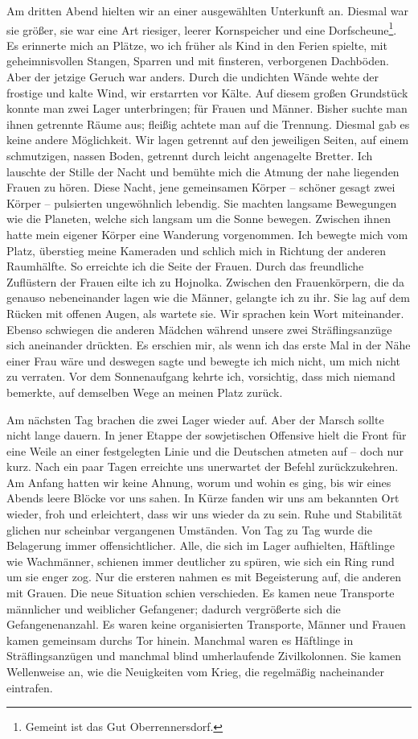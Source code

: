 \documentclass[a4paper,12pt,ngerman,
]{nisebook}
\begin{document}
Am dritten Abend hielten wir an einer ausgewählten Unterkunft an. Diesmal war sie größer, sie war eine Art riesiger, leerer Kornspeicher und eine Dorfscheune\footnote{Gemeint ist das Gut Oberrennersdorf.}. Es erinnerte mich an Plätze, wo ich früher als Kind in den Ferien spielte, mit geheimnisvollen Stangen, Sparren und mit finsteren, verborgenen Dachböden. Aber der jetzige Geruch war anders. Durch die undichten Wände wehte der frostige und kalte Wind, wir erstarrten vor Kälte. Auf diesem großen Grundstück konnte man zwei Lager unterbringen; für Frauen und Männer. Bisher suchte man ihnen getrennte Räume aus; fleißig achtete man auf die Trennung. Diesmal gab es keine andere Möglichkeit. Wir lagen getrennt auf den jeweiligen Seiten, auf einem schmutzigen, nassen Boden, getrennt durch leicht angenagelte Bretter. Ich lauschte der Stille der Nacht und bemühte mich die Atmung der nahe liegenden Frauen zu hören. Diese Nacht, jene gemeinsamen Körper -- schöner gesagt zwei Körper -- pulsierten ungewöhnlich lebendig. Sie machten langsame Bewegungen wie die Planeten, welche sich langsam um die Sonne bewegen. Zwischen ihnen hatte mein eigener Körper eine Wanderung vorgenommen. Ich bewegte mich vom Platz, überstieg meine Kameraden und schlich mich in Richtung der anderen Raumhälfte. So erreichte ich die Seite der Frauen. Durch das freundliche Zuflüstern der Frauen eilte ich zu Hojnolka. Zwischen den Frauenkörpern, die da genauso nebeneinander lagen wie die Männer, gelangte ich zu ihr. Sie lag auf dem Rücken mit offenen Augen, als wartete sie. Wir sprachen kein Wort miteinander. Ebenso schwiegen die anderen Mädchen während unsere zwei Sträflingsanzüge sich aneinander drückten. Es erschien mir, als wenn ich das erste Mal in der Nähe einer Frau wäre und deswegen sagte und bewegte ich mich nicht, um mich nicht zu verraten. Vor dem Sonnenaufgang kehrte ich, vorsichtig, dass mich niemand bemerkte, auf demselben Wege an meinen Platz zurück.

Am nächsten Tag brachen die zwei Lager wieder auf. Aber der Marsch sollte nicht lange dauern. In jener Etappe der sowjetischen Offensive hielt die Front für eine Weile an einer festgelegten Linie und die Deutschen atmeten auf -- doch nur kurz. Nach ein paar Tagen erreichte uns unerwartet der Befehl zurückzukehren. Am Anfang hatten wir keine Ahnung, worum und wohin es ging, bis wir eines Abends leere Blöcke vor uns sahen. In Kürze fanden wir uns am bekannten Ort wieder, froh und erleichtert, dass wir uns wieder da zu sein. Ruhe und Stabilität glichen nur scheinbar vergangenen Umständen. Von Tag zu Tag wurde die Belagerung immer offensichtlicher. Alle, die sich im Lager aufhielten, Häftlinge wie Wachmänner, schienen immer deutlicher zu spüren, wie sich ein Ring rund um sie enger zog. Nur die ersteren nahmen es mit Begeisterung auf, die anderen mit Grauen. Die neue Situation schien verschieden. Es kamen neue Transporte männlicher und weiblicher Gefangener; dadurch vergrößerte sich die Gefangenenanzahl. Es waren keine organisierten Transporte, Männer und Frauen kamen gemeinsam durchs Tor hinein. Manchmal waren es Häftlinge in Sträflingsanzügen und manchmal blind umherlaufende Zivilkolonnen. Sie kamen Wellenweise an, wie die Neuigkeiten vom Krieg, die regelmäßig nacheinander eintrafen.
\end{document}
